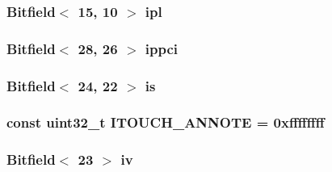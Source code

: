 \label{namespaceMipsISA_a4c627576c8807b5e6378b05b8d3b7489}
\hypertarget{namespaceMipsISA_a293972dea342ee9036f13ec25bc9c278}{
\subsubsection[{ipl}]{\setlength{\rightskip}{0pt plus 5cm}Bitfield$<$ 15, 10 $>$ {\bf ipl}}}
\label{namespaceMipsISA_a293972dea342ee9036f13ec25bc9c278}
\hypertarget{namespaceMipsISA_a7309c867975d199212ccce1ff17dae8f}{
\subsubsection[{ippci}]{\setlength{\rightskip}{0pt plus 5cm}Bitfield$<$ 28, 26 $>$ {\bf ippci}}}
\label{namespaceMipsISA_a7309c867975d199212ccce1ff17dae8f}
\hypertarget{namespaceMipsISA_aea57d259bbcf928acce679375552af95}{
\subsubsection[{ipti}]{}}
\label{namespaceMipsISA_aea57d259bbcf928acce679375552af95}
\hypertarget{namespaceMipsISA_a366f619fc9b4d8c3e351029137f7ad30}{
\subsubsection[{is}]{\setlength{\rightskip}{0pt plus 5cm}Bitfield$<$ 24, 22 $>$ {\bf is}}}
\label{namespaceMipsISA_a366f619fc9b4d8c3e351029137f7ad30}
\hypertarget{namespaceMipsISA_a447da7e9cffb00a93289a24c904056a7}{
\subsubsection[{ITOUCH\_\-ANNOTE}]{\setlength{\rightskip}{0pt plus 5cm}const {\bf uint32\_\-t} {\bf ITOUCH\_\-ANNOTE} = 0xffffffff}}
\label{namespaceMipsISA_a447da7e9cffb00a93289a24c904056a7}
\hypertarget{namespaceMipsISA_a9d394333dd818fb73be38d6b183251c6}{
\subsubsection[{iv}]{\setlength{\rightskip}{0pt plus 5cm}Bitfield$<$ 23 $>$ {\bf iv}}}
